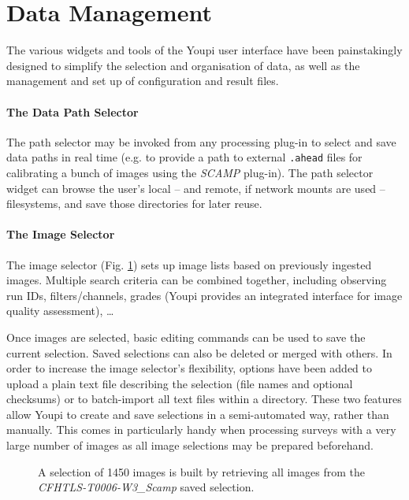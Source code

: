 \documentclass[11pt,twoside]{article}  %
\begin{document}
\section{Data Management}

The various widgets and tools of the Youpi user interface have been painstakingly designed to
simplify the selection and organisation of data, as well as the management and set up of
configuration and result files.

\paragraph{The Data Path Selector}

The path selector may be invoked from any processing plug-in to select and save data paths
in real time (e.g. to provide a path to external {\tt .ahead} files for calibrating a bunch of
images using the \emph{SCAMP} plug-in). The path selector widget can browse the user's local
-- and remote, if network mounts are used -- filesystems, and save those directories for later
reuse.

\paragraph{The Image Selector}\label{sec:ims}

The image selector (Fig. \ref{fig:ims}) sets up image lists based on previously 
ingested images. Multiple search criteria can be combined together, including observing run IDs,
filters/channels, grades (Youpi provides an integrated interface for image quality assessment), \ldots

Once images are selected, basic editing commands can be used to save the current 
selection. Saved selections can also be deleted or merged with others. In order to increase the 
image selector's flexibility, options have been added to upload a plain text file describing the 
selection (file names and optional checksums) or to batch-import all text files within 
a directory. These two features allow Youpi to create and save selections in a semi-automated way,
rather than manually. This comes in particularly handy when processing surveys with a very large
number of images as all image selections may be prepared beforehand.

\begin{figure}[h]
\caption{A selection of 1450 images is built by retrieving all images from the 
\emph{CFHTLS-T0006-W3\_Scamp} saved selection.}\label{fig:ims}
\end{figure}
\end{document}
